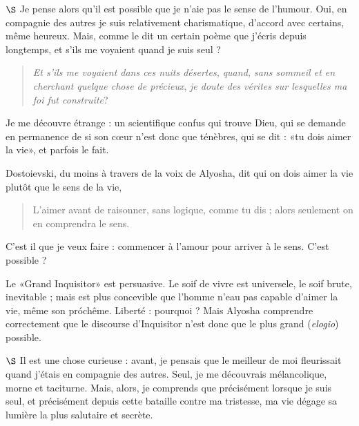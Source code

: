 \documentclass[a4paper, 12pt]{article}
\begin{document}
\pagebreak 
$\S$ Je pense alors qu'il est possible que je n'aie pas le sense de l'humour.
Oui, en compagnie des autres je suis relativement charismatique, d'accord avec
certains, même heureux. Mais, comme le dit un certain poème que j'écris depuis
longtemps, et s'ils me voyaient quand je suis seul ? 

\begin{quote}
    \textit{Et s'ils me voyaient dans ces nuits désertes,}\newline
    \textit{quand, sans sommeil et en cherchant quelque chose de
    précieux},\newline
    \textit{je doute des vérites sur lesquelles ma foi fut construite}?
\end{quote}

Je me découvre étrange : un scientifique confus qui trouve Dieu, qui se demande
en permanence de si son cœur n'est donc que ténèbres, qui se dit : 
«tu dois aimer la vie», et parfois le fait. 

Dostoievski, du moins à travers de la voix de Alyosha, dit qui on dois aimer la
vie plutôt que le sens de la vie,

\begin{quote}
 L’aimer avant de raisonner, sans logique, comme tu dis ; alors seulement on en comprendra le sens. 
\end{quote}

C'est il que je veux faire : commencer à l'amour pour arriver à le sens. C'est
possible ? 

Le «Grand Inquisitor» est persuasive. Le soif de vivre est universele, le soif
brute, inevitable ; mais est plus concevible que l'homme n'eau pas capable
d'aimer la vie, même son próchême. Liberté : pourquoi ? Mais Alyosha comprendre
correctement que le discourse d'Inquisitor n'est donc que le plus grand
(\textit{elogio}) possible. 

\pagebreak 

$\S$ Il est une chose curieuse : avant, je pensais que le meilleur de moi
fleurissait quand j'étais en compagnie des autres. Seul, je me découvrais
mélancolique, morne et taciturne. Mais, alors, je comprends que précisément
lorsque je suis seul, et précisément depuis cette bataille contre ma tristesse,
ma vie dégage sa lumière la plus salutaire et secrète. 
\end{document}
